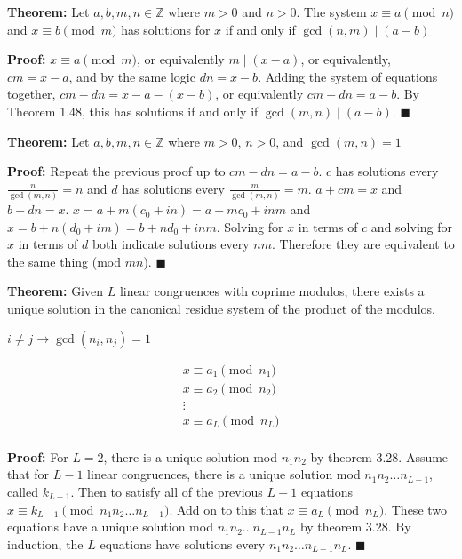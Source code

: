 \item \textbf{Theorem:} Let \(a, b, m, n \in \mathbb Z\) where \(m > 0\) and \(n > 0\). The system \(x \equiv a \pmod n\) and \(x \equiv b \pmod m\) has solutions for \(x\) if and only if \(\gcd(n, m) \mid (a - b)\)

\textbf{Proof:} \(x \equiv a \pmod m\), or equivalently \(m \mid (x-a)\), or equivalently, \(cm = x - a\), and by the same logic \(dn = x - b\). Adding the system of equations together, \(cm - dn = x - a - (x - b)\), or equivalently \(cm - dn = a - b\). By Theorem 1.48, this has solutions if and only if \(\gcd(m, n) \mid (a - b)\). {\tiny \(\blacksquare\)}

\item \textbf{Theorem:} Let \(a, b, m, n \in \mathbb Z\) where \(m > 0\), \(n > 0\), and \(\gcd(m, n) = 1\)

\textbf{Proof:} Repeat the previous proof up to \(cm - dn = a - b\).  \(c\) has solutions every \(\frac{n}{\gcd(m, n)} = n\) and \(d\) has solutions every \(\frac{m}{\gcd(m, n)} = m\). \(a + cm = x\) and \(b + dn = x\). \(x = a + m(c_0 + in) = a + m c_0 + inm\) and \(x = b + n(d_0 + im) = b + nd_0 + inm\). Solving for \(x\) in terms of \(c\) and solving for \(x\) in terms of \(d\) both indicate solutions every \(nm\). Therefore they are equivalent to the same thing (mod \({mn}\)). {\tiny \(\blacksquare\)}

\item \textbf{Theorem:} Given \(L\) linear congruences with coprime modulos, there exists a unique solution in the canonical residue system of the product of the modulos.

\(i \neq j \rightarrow \gcd(n_i, n_j) = 1\)

\[
\begin{array}{l}
x \equiv a_1 \pmod{n_1} \\
x \equiv a_2 \pmod{n_2} \\
\vdots \\
x \equiv a_L \pmod{n_L} \\
\end{array}
\]


\textbf{Proof:} For \(L = 2\), there is a unique solution mod \(n_1 n_2\) by theorem 3.28. Assume that for \(L-1\) linear congruences, there is a unique solution mod \(n_1 n_2 \dots n_{L-1}\), called \(k_{L-1}\). Then to satisfy all of the previous \(L-1\) equations \(x \equiv k_{L-1} \pmod {n_1 n_2 \dots n_{L-1}}\). Add on to this that \(x \equiv a_L \pmod {n_L}\). These two equations have a unique solution mod \(n_1 n_2 \dots n_{L-1} n_L\) by theorem 3.28. By induction, the \(L\) equations have solutions every \(n_1 n_2 \dots n_{L-1} n_L\). {\tiny \(\blacksquare\)}


